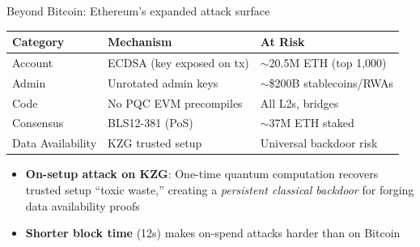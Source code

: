 \ifdefined\PRESENTATION\else\PassOptionsToClass{handout}{beamer}\fi\documentclass[aspectratio=169, lualatex]{beamer}
\begin{document}
\begin{frame}{Beyond Bitcoin: Ethereum's expanded attack surface}
	\begin{center}
		\small
		\begin{tabular}{|l|l|l|}
			\hline
			\textbf{Category} & \textbf{Mechanism}        & \textbf{At Risk}              \\
			\hline
			\hline
			Account           & ECDSA (key exposed on tx) & $\sim$20.5M ETH (top 1,000)   \\
			\hline
			Admin             & Unrotated admin keys      & $\sim$\$200B stablecoins/RWAs \\
			\hline
			Code              & No PQC EVM precompiles    & All L2s, bridges              \\
			\hline
			Consensus         & BLS12-381 (PoS)           & $\sim$37M ETH staked          \\
			\hline
			Data Availability & KZG trusted setup         & Universal backdoor risk       \\
			\hline
		\end{tabular}
	\end{center}
	\begin{itemize}
		\item \textbf{On-setup attack on KZG}: One-time quantum computation recovers trusted setup ``toxic waste,'' creating a \textit{persistent classical backdoor} for forging data availability proofs
		\item \textbf{Shorter block time} (12s) makes on-spend attacks harder than on Bitcoin
	\end{itemize}
\end{frame}
\end{document}
